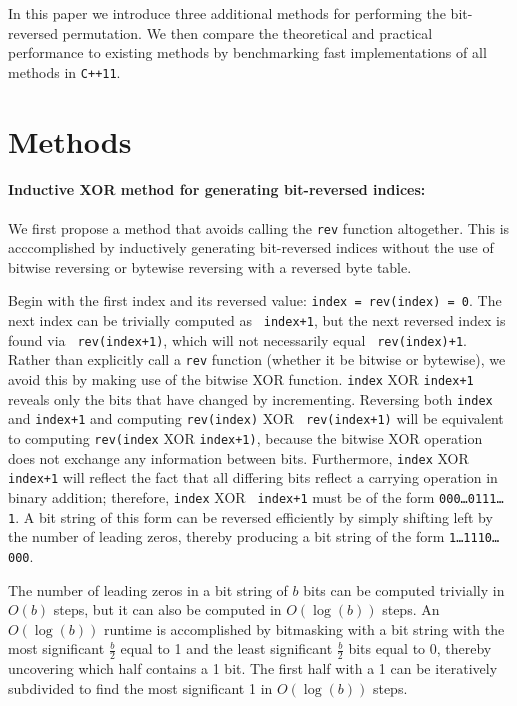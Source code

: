 \documentclass[10pt]{article}
\begin{document}
In this paper we introduce three additional methods for performing the
bit-reversed permutation. We then compare the theoretical and
practical performance to existing methods by benchmarking fast
implementations of all methods in {\tt C++11}.

\section*{Methods}

\paragraph{Inductive XOR method for generating bit-reversed indices:}
We first propose a method that avoids calling the {\tt rev} function
altogether. This is acccomplished by inductively generating
bit-reversed indices without the use of bitwise reversing or bytewise
reversing with a reversed byte table.

Begin with the first index and its reversed value: {\tt index =
  rev(index) = 0}. The next index can be trivially computed as {\tt
  index+1}, but the next reversed index is found via {\tt
  rev(index+1)}, which will not necessarily equal {\tt
  rev(index)+1}. Rather than explicitly call a {\tt rev} function
(whether it be bitwise or bytewise), we avoid this by making use of
the bitwise XOR function. {\tt index} XOR {\tt index+1} reveals only
the bits that have changed by incrementing. Reversing both {\tt index}
and {\tt index+1} and computing {\tt rev(index)} XOR {\tt
  rev(index+1)} will be equivalent to computing {\tt rev(}{\tt index}
XOR {\tt index+1)}, because the bitwise XOR operation does not
exchange any information between bits. Furthermore, {\tt index} XOR
{\tt index+1} will reflect the fact that all differing bits reflect a
carrying operation in binary addition; therefore, {\tt index} XOR {\tt
  index+1} must be of the form {\tt 000\ldots 0111\ldots 1}. A bit
string of this form can be reversed efficiently by simply shifting
left by the number of leading zeros, thereby producing a bit string of
the form {\tt 1\ldots 1110\ldots 000}.

The number of leading zeros in a bit string of $b$ bits can be
computed trivially in $O(b)$ steps, but it can also be computed in
$O(\log(b))$ steps. An $O(\log(b))$ runtime is accomplished by
bitmasking with a bit string with the most significant $\frac{b}{2}$
equal to 1 and the least significant $\frac{b}{2}$ bits equal to 0,
thereby uncovering which half contains a 1 bit. The first half with a
1 can be iteratively subdivided to find the most significant 1 in
$O(\log(b))$ steps\cite{anderson:bit}.
\end{document}

